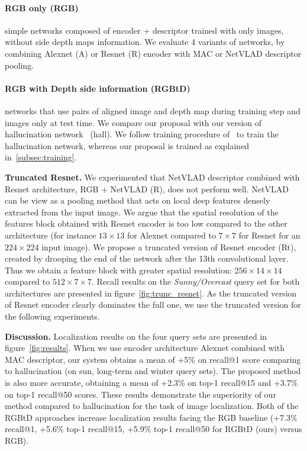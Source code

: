     \paragraph{RGB only (\textbf{RGB})} simple networks composed of encoder + descriptor trained with only images, without side depth maps information. We evaluate 4 variants of networks, by combining Alexnet (A) or Resnet (R) encoder with MAC or NetVLAD descriptor pooling.
    \paragraph{RGB with Depth side information (\textbf{RGBtD})} networks that use pairs of aligned image and depth map during training step and images only at test time. We compare our proposal with our version of hallucination network~\cite{Hoffman2016} (hall). We follow training procedure of~\cite{Hoffman2016} to train the hallucination network, whereas our proposal is trained as explained in~\ref{subsec:training}. 

\vspace{4pt}\noindent\textbf{Truncated Resnet.} We experimented that NetVLAD descriptor combined with Resnet architecture, RGB + NetVLAD (R), does not perform well. NetVLAD can be view as a pooling method that acts on local deep features densely extracted from the input image. We argue that the spatial resolution of the features block obtained with Resnet encoder is too low compared to the other architecture (for instance $13\times13$ for Alexnet compared to $7\times7$ for Resnet for an $224\times224$ input image). We propose a truncated version of Resnet encoder (Rt), created by drooping the end of the network after the 13th convolutional layer. Thus we obtain a feature block with greater spatial resolution: $256\times14\times14$ compared to $512\times7\times7$. Recall results on the \textit{Sunny/Overcast} query set for both architectures are presented in figure~\ref{fig:trunc_resnet}. As the truncated version of Resnet encoder clearly dominates the full one, we use the truncated version for the following experiments.

\vspace{4pt}\noindent\textbf{Discussion.} Localization results on the four query sets are presented in figure~\ref{fig:results}.  When we use encoder architecture Alexnet combined with MAC descriptor, our system obtains a mean of +5\% on recall@1 score comparing to hallucination (on sun, long-term and winter query sets). The proposed method is also more accurate, obtaining a mean of +2.3\% on top-1 recall@15 and +3.7\% on top-1 recall@50 scores. These results demonstrate the superiority of our method compared to hallucination for the task of image localization. Both of the RGBtD approaches increase localization results facing the RGB baseline (+7.3\% recall@1, +5.6\% top-1 recall@15, +5.9\% top-1 recall@50 for RGBtD (ours) versus RGB).

